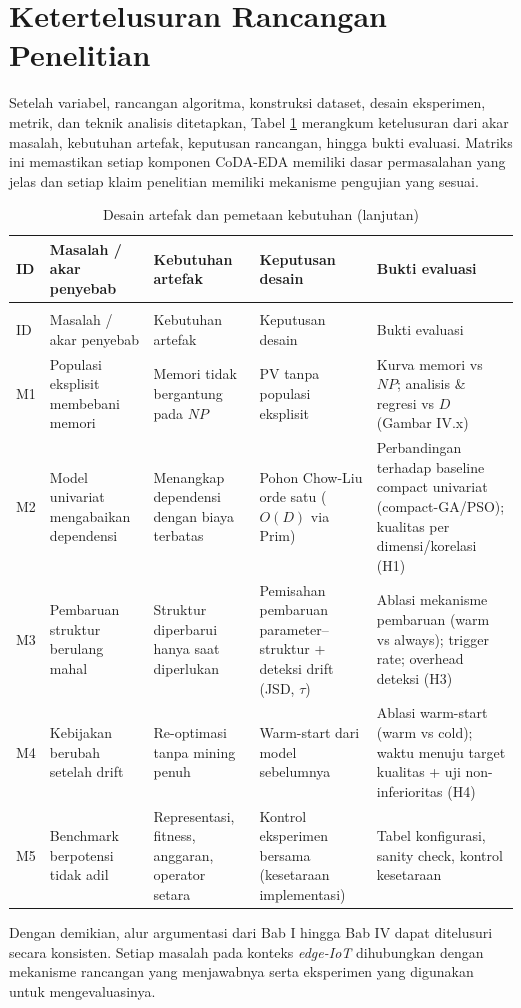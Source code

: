 \section{Ketertelusuran Rancangan Penelitian}

Setelah variabel, rancangan algoritma, konstruksi dataset, desain eksperimen, metrik, dan teknik analisis ditetapkan, Tabel \ref{tab:pemetaan-kebutuhan} merangkum ketelusuran dari akar masalah, kebutuhan artefak, keputusan rancangan, hingga bukti evaluasi. 
Matriks ini memastikan setiap komponen CoDA-EDA memiliki dasar permasalahan yang jelas dan setiap klaim penelitian memiliki mekanisme pengujian yang sesuai.

{\small %
\begin{longtable}{@{} >{\centering\arraybackslash}p{1cm} >{\raggedright\arraybackslash}p{3cm} >{\raggedright\arraybackslash}p{3cm} >{\raggedright\arraybackslash}p{3.0cm} >{\raggedright\arraybackslash}p{3cm} @{}}
\caption{Desain artefak dan pemetaan kebutuhan}
\label{tab:pemetaan-kebutuhan} \\
\toprule
ID & Masalah / akar penyebab & Kebutuhan artefak & Keputusan desain & Bukti evaluasi \\
\midrule
\endfirsthead
\caption{Desain artefak dan pemetaan kebutuhan (lanjutan)} \\
ID & Masalah / akar penyebab & Kebutuhan artefak & Keputusan desain & Bukti evaluasi \\
\midrule
\endhead
\bottomrule
\endfoot
M1 & Populasi eksplisit membebani memori & Memori tidak bergantung pada $NP$ & PV tanpa populasi eksplisit & Kurva memori vs $NP$; analisis \& regresi vs $D$ (Gambar IV.x) \\
M2 & Model univariat mengabaikan dependensi & Menangkap dependensi dengan biaya terbatas & Pohon Chow-Liu orde satu ($O(D)$ via Prim) & Perbandingan terhadap baseline compact univariat (compact-GA/PSO); kualitas per dimensi/korelasi (H1) \\
M3 & Pembaruan struktur berulang mahal & Struktur diperbarui hanya saat diperlukan & Pemisahan pembaruan parameter--struktur + deteksi drift (JSD, $\tau$) & Ablasi mekanisme pembaruan (warm vs always); trigger rate; overhead deteksi (H3) \\
M4 & Kebijakan berubah setelah drift & Re-optimasi tanpa mining penuh & Warm-start dari model sebelumnya & Ablasi warm-start (warm vs cold); waktu menuju target kualitas + uji non-inferioritas (H4) \\
M5 & Benchmark berpotensi tidak adil & Representasi, fitness, anggaran, operator setara & Kontrol eksperimen bersama (kesetaraan implementasi) & Tabel konfigurasi, sanity check, kontrol kesetaraan \\
\end{longtable}
} %

Dengan demikian, alur argumentasi dari Bab I hingga Bab IV dapat ditelusuri secara konsisten. 
Setiap masalah pada konteks \textit{edge-IoT} dihubungkan dengan mekanisme rancangan yang menjawabnya serta eksperimen yang digunakan untuk mengevaluasinya.